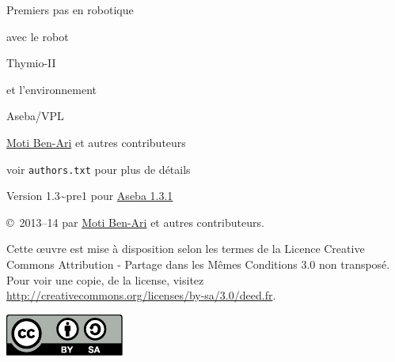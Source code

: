 \thispagestyle{empty}

\begin{center}
\begin{Huge}
\begin{bfseries}
Premiers pas en robotique
\end{bfseries}

avec le robot

\begin{bfseries}
Thymio-II
\end{bfseries}

et l'environnement

\begin{bfseries}
Aseba/VPL
\end{bfseries}

\end{Huge}

\vskip 2cm

\begin{LARGE}
\href{http://www.weizmann.ac.il/sci-tea/benari/}{Moti Ben-Ari} et autres contributeurs\\
\end{LARGE}
\bigskip
\begin{Large}
voir \texttt{authors.txt} pour plus de détails
\end{Large}

\vskip 1cm

\begin{Large}
Version 1.3{\textasciitilde}pre1 pour \href{https://aseba.wikidot.com/fr:downloadinstall}{Aseba 1.3.1}
\end{Large}

\end{center}

\vfill

\begin{center}
\copyright{}\  2013--14 par \href{http://www.weizmann.ac.il/sci-tea/benari/}{Moti Ben-Ari} et autres contributeurs.
\end{center}

Cette œuvre est mise à disposition selon les termes de la Licence Creative Commons Attribution - Partage dans les Mêmes Conditions 3.0 non transposé.
Pour voir une copie, de la license, visitez \url{http://creativecommons.org/licenses/by-sa/3.0/deed.fr}.

\begin{center}
\includegraphics[width=.2\textwidth]{../images/by-sa}
\end{center}
